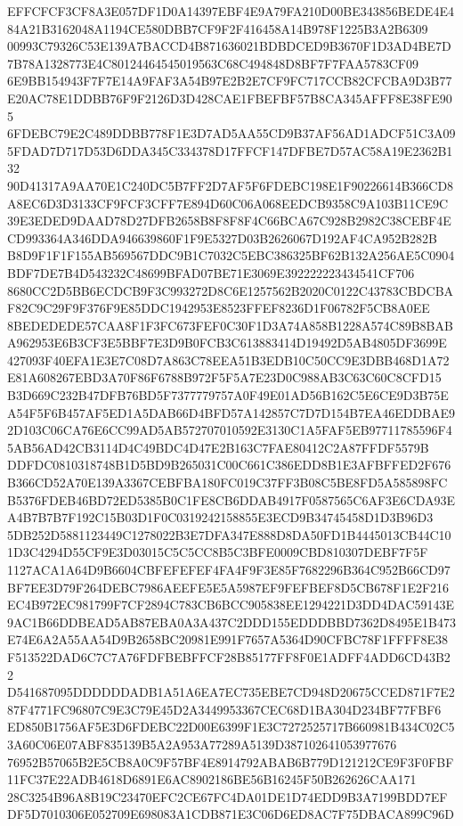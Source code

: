 \documentclass[UTF8,fontset=fandol,zihao=-4,a4paper]{ctexart}
\begin{document}
{{EFFCFCF3CF8A3E057DF1D0A14397EBF4E9A79FA210D00BE343856BEDE4E484A21B3162048A1194CE580DBB7CF9F2F416458A14B978F1225B3A2B6309
00993C79326C53E139A7BACCD4B871636021BDBDCED9B3670F1D3AD4BE7D7B78A1328773E4C80124464545019563C68C494848D8BF7F7FAA5783CF09
6E9BB154943F7F7E14A9FAF3A54B97E2B2E7CF9FC717CCB82CFCBA9D3B77E20AC78E1DDBB76F9F2126D3D428CAE1FBEFBF57B8CA345AFFF8E38FE905
6FDEBC79E2C489DDBB778F1E3D7AD5AA55CD9B37AF56AD1ADCF51C3A095FDAD7D717D53D6DDA345C334378D17FFCF147DFBE7D57AC58A19E2362B132
90D41317A9AA70E1C240DC5B7FF2D7AF5F6FDEBC198E1F90226614B366CD8A8EC6D3D3133CF9FCF3CFF7E894D60C06A068EEDCB9358C9A103B11CE9C
39E3EDED9DAAD78D27DFB2658B8F8F8F4C66BCA67C928B2982C38CEBF4ECD993364A346DDA946639860F1F9E5327D03B2626067D192AF4CA952B282B
B8D9F1F1F155AB569567DDC9B1C7032C5EBC386325BF62B132A256AE5C0904BDF7DE7B4D543232C48699BFAD07BE71E3069E392222223434541CF706
8680CC2D5BB6ECDCB9F3C993272D8C6E1257562B2020C0122C43783CBDCBAF82C9C29F9F376F9E85DDC1942953E8523FFEF8236D1F06782F5CB8A0EE
8BEDEDEDE57CAA8F1F3FC673FEF0C30F1D3A74A858B1228A574C89B8BABA962953E6B3CF3E5BBF7E3D9B0FCB3C613883414D19492D5AB4805DF3699E
427093F40EFA1E3E7C08D7A863C78EEA51B3EDB10C50CC9E3DBB468D1A72E81A608267EBD3A70F86F6788B972F5F5A7E23D0C988AB3C63C60C8CFD15
B3D669C232B47DFB76BD5F7377779757A0F49E01AD56B162C5E6CE9D3B75EA54F5F6B457AF5ED1A5DAB66D4BFD57A142857C7D7D154B7EA46EDDBAE9
2D103C06CA76E6CC99AD5AB572707010592E3130C1A5FAF5EB97711785596F45AB56AD42CB3114D4C49BDC4D47E2B163C7FAE80412C2A87FFDF5579B
DDFDC0810318748B1D5BD9B265031C00C661C386EDD8B1E3AFBFFED2F676B366CD52A70E139A3367CEBFBA180FC019C37FF3B08C5BE8FD5A585898FC
B5376FDEB46BD72ED5385B0C1FE8CB6DDAB4917F0587565C6AF3E6CDA93EA4B7B7B7F192C15B03D1F0C0319242158855E3ECD9B34745458D1D3B96D3
5DB252D5881123449C1278022B3E7DFA347E888D8DA50FD1B4445013CB44C101D3C4294D55CF9E3D03015C5C5CC8B5C3BFE0009CBD810307DEBF7F5F
1127ACA1A64D9B6604CBFEFEFEF4FA4F9F3E85F7682296B364C952B66CD97BF7EE3D79F264DEBC7986AEEFE5E5A5987EF9FEFBEF8D5CB678F1E2F216
EC4B972EC981799F7CF2894C783CB6BCC905838EE1294221D3DD4DAC59143E9AC1B66DDBEAD5AB87EBA0A3A437C2DDD155EDDDBBD7362D8495E1B473
E74E6A2A55AA54D9B2658BC20981E991F7657A5364D90CFBC78F1FFFF8E38F513522DAD6C7C7A76FDFBEBFFCF28B85177FF8F0E1ADFF4ADD6CD43B22
D541687095DDDDDDADB1A51A6EA7EC735EBE7CD948D20675CCED871F7E287F4771FC96807C9E3C79E45D2A3449953367CEC68D1BA304D234BF77FBF6
ED850B1756AF5E3D6FDEBC22D00E6399F1E3C7272525717B660981B434C02C53A60C06E07ABF835139B5A2A953A77289A5139D387102641053977676
76952B57065B2E5CB8A0C9F57BF4E8914792ABAB6B779D121212CE9F3F0FBF11FC37E22ADB4618D6891E6AC8902186BE56B16245F50B262626CAA171
28C3254B96A8B19C23470EFC2CE67FC4DA01DE1D74EDD9B3A7199BDD7EFDF5D7010306E052709E698083A1CDB871E3C06D6ED8AC7F75DBACA899C96D
}}
\end{document}
